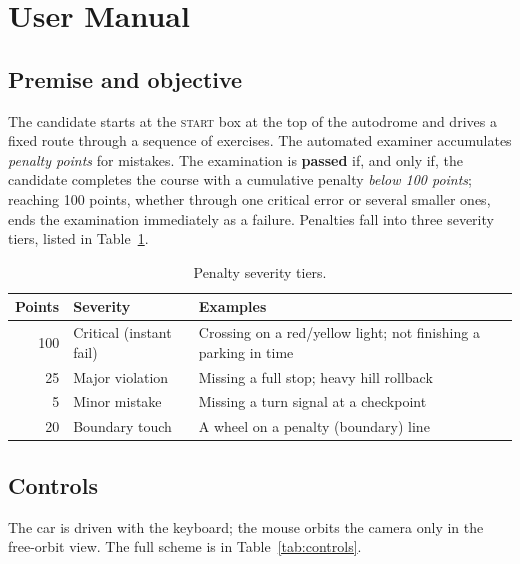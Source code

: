 \documentclass[11pt]{article}
\begin{document}
\section{User Manual}

\subsection{Premise and objective}

The candidate starts at the \textsc{start} box at the top of the autodrome and
drives a fixed route through a sequence of exercises. The automated examiner
accumulates \emph{penalty points} for mistakes. The examination is
\textbf{passed} if, and only if, the candidate completes the course with a
cumulative penalty \emph{below 100 points}; reaching 100 points, whether through
one critical error or several smaller ones, ends the examination immediately as a
failure. Penalties fall into three severity tiers, listed in
Table~\ref{tab:tiers}.

\begin{table}[h]
  \centering
  \caption{Penalty severity tiers.}
  \label{tab:tiers}
  \begin{tabular}{rll}
    \toprule
    Points & Severity & Examples \\
    \midrule
    100 & Critical (instant fail) & Crossing on a red/yellow light; not finishing a parking in time \\
    25  & Major violation & Missing a full stop; heavy hill rollback \\
    5   & Minor mistake & Missing a turn signal at a checkpoint \\
    20  & Boundary touch & A wheel on a penalty (boundary) line \\
    \bottomrule
  \end{tabular}
\end{table}

\subsection{Controls}

The car is driven with the keyboard; the mouse orbits the camera only in the
free-orbit view. The full scheme is in Table~\ref{tab:controls}.
\end{document}
